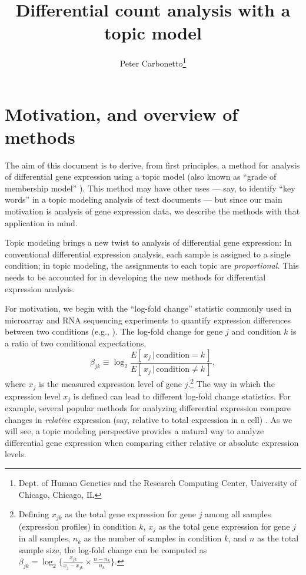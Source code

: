 \documentclass[final]{siamart171218}
\title{Differential count analysis with a topic model}
\author{Peter Carbonetto\thanks{Dept. of Human Genetics and the Research Computing Center, University of Chicago, Chicago, IL}}
\begin{document}
\maketitle

\section{Motivation, and overview of methods}

The aim of this document is to derive, from first principles, a method
for analysis of differential gene expression using a topic model (also
known as ``grade of membership model'' \cite{dey-2017}). This method
may have other uses --- say, to identify ``key words'' in a topic
modeling analysis of text documents --- but since our main motivation
is analysis of gene expression data, we describe the methods with that
application in mind.

Topic modeling brings a new twist to analysis of differential gene
expression: In conventional differential expression analysis, each
sample is assigned to a single condition; in topic modeling, the
assignments to each topic are {\em proportional.} This needs to be
accounted for in developing the new methods for differential
expression analysis.

For motivation, we begin with the ``log-fold change'' statistic
commonly used in microarray and RNA sequencing experiments to quantify
expression differences between two conditions (e.g.,
\cite{cui-churchill-2003, quackenbush-2002}). The log-fold change for
gene $j$ and condition $k$ is a ratio of two conditional expectations,
\begin{equation}
\beta_{jk} \equiv
\log_2 \frac{E[\,x_j \,|\, \mathrm{condition} = k\,]}
            {E[\,x_j \,|\, \mathrm{condition} \neq k\,]},
\label{eq:lfc}
\end{equation}
where $x_j$ is the measured expression level of gene
$j$.\footnote{Defining $x_{jk}$ as the total gene expression for gene
  $j$ among all samples (expression profiles) in condition $k$, $x_j$
  as the total gene expression for gene $j$ in all samples, $n_k$ as
  the number of samples in condition $k$, and $n$ as the total sample
  size, the log-fold change can be computed as $\beta_{jk} = \log_2
  \Big\{ \frac{x_{jk}}{x_j - x_{jk}} \times \frac{n - n_k}{n_k}
  \Big\}$.} The way in which the expression level $x_j$ is defined can
lead to different log-fold change statistics. For example, several
popular methods for analyzing differential expression compare changes
in {\em relative} expression (say, relative to total expression in a
cell) \cite{bullard-2010, voom, DESeq2, edgeR}. As we will see, a
topic modeling perspective provides a natural way to analyze
differential gene expression when comparing either relative or
absolute expression levels.
\end{document}
